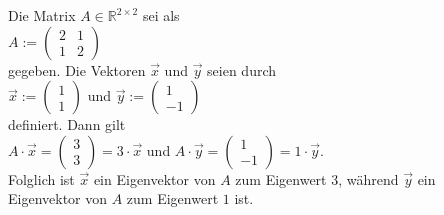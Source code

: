 \example
Die Matrix $A \in \mathbb{R}^{2 \times 2}$ sei als
\\[0.2cm]
\hspace*{1.3cm}
$A := \left(
  \begin{array}{ll}
    2 & 1 \\
    1 & 2
  \end{array}
  \right)
$
\\[0.2cm]
gegeben.  Die Vektoren $\vec{x}$ und $\vec{y}$ seien durch
\\[0.2cm]
\hspace*{1.3cm}
$\vec{x} := \left(
\begin{array}{r}
  1 \\
  1    
\end{array}\right)
$ \quad und \quad 
$\vec{y} := \left(
\begin{array}{r}
  1 \\
  -1    
\end{array}
\right)
$
\\[0.2cm]
definiert.  Dann gilt 
\\[0.2cm]
\hspace*{1.3cm}
$A \cdot \vec{x} = \left(
\begin{array}{r}
  3 \\
  3    
\end{array}\right) = 3 \cdot \vec{x}$ \quad und \quad
$A \cdot \vec{y} = \left(
\begin{array}{r}
  1 \\
  -1    
\end{array}\right) = 1 \cdot \vec{y}$.
\\[0.2cm]
Folglich ist $\vec{x}$ ein Eigenvektor von $A$ zum Eigenwert $3$, w\"ahrend $\vec{y}$ ein
Eigenvektor von $A$ zum Eigenwert $1$ ist.  \eox

